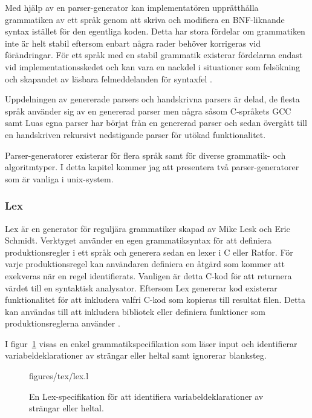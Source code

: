 Med hjälp av en parser-generator kan implementatören upprätthålla grammatiken
av ett språk genom att skriva och modifiera en BNF-liknande syntax istället
för den egentliga koden. Detta har stora fördelar om grammatiken inte är helt
stabil eftersom enbart några rader behöver korrigeras vid förändringar. För
ett språk med en stabil grammatik existerar fördelarna endast vid
implementationsskedet och kan vara en nackdel i situationer som felsökning och
skapandet av läsbara felmeddelanden för syntaxfel \citep[s. 175]{bf09}.

Uppdelningen av genererade parsers och handskrivna parsers är delad, de flesta
språk använder sig av en genererad parser men några såsom C-språkets GCC \citep{gcc}
samt Luas egna parser \citep{luaimp} har börjat från en genererad parser och
sedan övergått till en handskriven rekursivt nedstigande parser för utökad
funktionalitet.

Parser-generatorer existerar för flera språk samt för diverse grammatik- och
algoritmtyper. I detta kapitel kommer jag att presentera två
parser-generatorer som är vanliga i unix-system.

\subsubsection{Lex}

Lex är en generator för reguljära grammatiker skapad av Mike Lesk och
Eric Schmidt. Verktyget använder en egen grammatiksyntax för att
definiera produktionsregler i ett språk och generera sedan en lexer i C eller
Ratfor. För varje produktionsregel kan användaren definiera en åtgärd som
kommer att exekveras när en regel identifierats. Vanligen är detta C-kod för
att returnera värdet till en syntaktisk analysator. Eftersom Lex genererar kod
existerar funktionalitet för att inkludera valfri C-kod som kopieras till
resultat filen. Detta kan användas till att inkludera bibliotek eller
definiera funktioner som produktionsreglerna använder \citep{lex}.

I figur~\ref{fig:lex} visas en enkel grammatikspecifikation som läser input
och identifierar variabeldeklarationer av strängar eller heltal samt ignorerar
blanksteg.

\begin{figure}[ht]
    {figures/tex/lex.l}
  \caption{En Lex-specifikation för att identifiera variabeldeklarationer av
    strängar eller heltal.}
  \label{fig:lex}
\end{figure}

